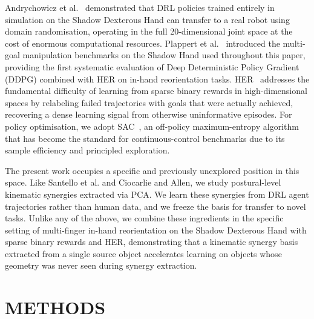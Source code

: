 \documentclass[letterpaper, 10 pt, conference]{ieeeconf}  %
\begin{document}
Andrychowicz et al.~\cite{c7} demonstrated that DRL policies trained entirely 
in simulation on the Shadow Dexterous Hand can transfer to a real robot 
using domain randomisation, operating in the full 20-dimensional joint 
space at the cost of enormous computational resources. Plappert et 
al.~\cite{c16} introduced the multi-goal manipulation benchmarks on the Shadow 
Hand used throughout this paper, providing the first systematic evaluation 
of Deep Deterministic Policy Gradient (DDPG) combined with HER on in-hand reorientation tasks. HER~\cite{c17} addresses the fundamental difficulty of learning 
from sparse binary rewards in high-dimensional spaces by relabeling failed 
trajectories with goals that were actually achieved, recovering a dense 
learning signal from otherwise uninformative episodes. For policy 
optimisation, we adopt SAC~\cite{c15}, an off-policy 
maximum-entropy algorithm that has become the standard for 
continuous-control benchmarks due to its sample efficiency and principled 
exploration.

The present work occupies a specific and previously unexplored position in 
this space. Like Santello et al. and Ciocarlie and Allen, we study 
postural-level kinematic synergies extracted via PCA. We learn these synergies from DRL agent trajectories rather 
than human data, and we freeze the basis for transfer to novel tasks. 
Unlike any of the above, we combine these ingredients in the specific 
setting of multi-finger in-hand reorientation on the Shadow Dexterous Hand 
with sparse binary rewards and HER, demonstrating that a kinematic synergy 
basis extracted from a single source object accelerates learning on objects 
whose geometry was never seen during synergy extraction.


\section{METHODS}
\label{sec: methods}
\end{document}
